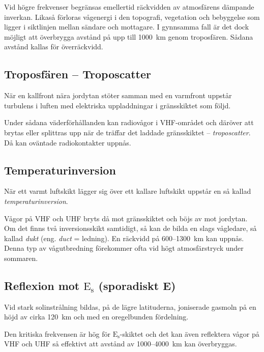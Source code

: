 Vid högre frekvenser begränsas emellertid räckvidden av atmosfärens
dämpande inverkan.
Likaså förloras vågenergi i den topografi, vegetation och bebyggelse som ligger
i siktlinjen mellan sändare och mottagare.
I gynnsamma fall är det dock möjligt att överbrygga avstånd på upp till 1000~km
genom troposfären.
Sådana avstånd kallas för överräckvidd.

\subsection{Troposfären -- Troposcatter}

När en kallfront nära jordytan stöter samman med en varmfront uppstår turbulens
i luften med elektriska uppladdningar i gränsskiktet som följd.

Under sådana väderförhållanden kan radiovågor i VHF-området och däröver att
brytas eller splittras upp när de träffar det laddade gränsskiktet --
\emph{troposcatter}.
Då kan oväntade radiokontakter uppnås.

\subsection{Temperaturinversion}

När ett varmt luftskikt lägger sig över ett kallare luftskikt uppstår
en så kallad \emph{temperaturinversion}.

Vågor på VHF och UHF bryts då mot gränsskiktet och böjs av mot jordytan.
Om det finns två inversionsskikt samtidigt, så kan de bilda
en slags vågledare, så kallad \emph{dukt} (eng. \emph{duct} = ledning).
En räckvidd på 600--1300~km kan uppnås.
Denna typ av vågutbredning förekommer ofta vid högt atmosfärstryck under
sommaren.

\subsection{Reflexion mot $\mathrm{E_s}$ (sporadiskt E)}

Vid stark solinstrålning bildas, på de lägre latituderna, joniserade
gasmoln på en höjd av cirka 120~km och med en oregelbunden fördelning.

Den kritiska frekvensen är hög för \(\mathrm{E_s}\)-skiktet och det kan även
reflektera vågor på VHF och UHF så effektivt att avstånd av 1000--4000~km kan
överbryggas.

